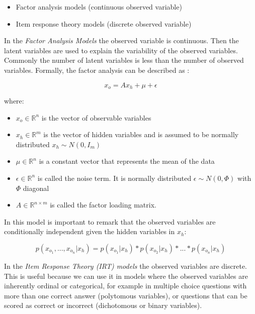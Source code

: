 \begin{itemize}
\item{Factor analysis models (continuous observed variable)}
\item{Item response theory models (discrete observed variable)}
\end{itemize}

In the \textit{Factor Analysis Models} the observed variable is continuous. Then the latent variables are used to explain the variability of the observed variables. Commonly the number of latent variables is less than the number of observed variables. Formally, the factor analysis can be described as \cite{pmr}:

\begin{equation}
x_{o} = Ax_{h} + \mu + \epsilon
\end{equation}

where:

\begin{itemize}
\item{$x_{o} \in \mathbb{R}^{n}$ is the vector of observable variables}
\item{$x_{h} \in \mathbb{R}^{m}$ is the vector of hidden variables and is assumed to be normally distributed $x_{h} \sim N(0, I_m)$}
\item{$\mu \in \mathbb{R}^{n}$ is a constant vector that represents the mean of the data}
\item{$\epsilon \in \mathbb{R}^{n}$ is called the noise term. It is normally distributed $\epsilon \sim N(0, \Phi)$ with $\Phi$ diagonal}
\item{$A \in \mathbb{R}^{n \times m}$ is called the factor loading matrix.}
\end{itemize}

In this model is important to remark that the observed variables are conditionally independent given the hidden variables in $x_{h}$:

\begin{equation}
p(x_{o_1}, ... , x_{o_n}| x_{h}) = p(x_{o_1}| x_{h})*p(x_{o_2}| x_{h}) * ...*p(x_{o_n}| x_{h})
\end{equation}

In the \textit{Item Response Theory (IRT) models} the observed variables are discrete. This is useful because we can use it in models where the observed variables are inherently ordinal or categorical, for example in multiple choice questions with more than one correct answer (polytomous variables), or questions that can be scored as correct or incorrect (dichotomous or binary variables).

